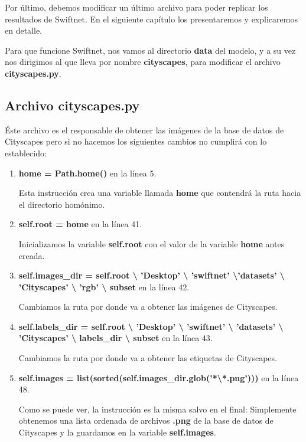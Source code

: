 Por último, debemos modificar un último archivo para poder replicar los resultados de Swiftnet. En el siguiente capítulo los presentaremos y explicaremos en detalle.

Para que funcione Swiftnet, nos vamos al directorio \textbf{data} del modelo, y a su vez nos dirigimos al que lleva por nombre \textbf{cityscapes}, para modificar el archivo \textbf{cityscapes.py}.

\subsection{Archivo cityscapes.py}

Éste archivo es el responsable de obtener las imágenes de la base de datos de Cityscapes pero si no hacemos los siguientes cambios no cumplirá con lo establecido:

\begin{enumerate}
\item \textbf{home = Path.home()} en la línea 5.

Esta instrucción crea una variable llamada \textbf{home} que contendrá la ruta hacia el directorio homónimo.

\item \textbf{self.root = home} en la línea 41.

Inicializamos la variable \textbf{self.root} con el valor de la variable \textbf{home} antes creada.

\item \textbf{self.images\_dir = self.root \textbackslash{} 'Desktop' \textbackslash{} 'swiftnet' \textbackslash{}'datasets' \textbackslash{} 'Cityscapes' \textbackslash{} 'rgb' \textbackslash{} subset} en la línea 42.

Cambiamos la ruta por donde va a obtener las imágenes de Cityscapes.

\item \textbf{self.labels\_dir = self.root \textbackslash{} 'Desktop' \textbackslash{} 'swiftnet' \textbackslash{} 'datasets' \textbackslash{} 'Cityscapes' \textbackslash{} labels\_dir \textbackslash{} subset} en la línea 43.

Cambiamos la ruta por donde va a obtener las etiquetas de Cityscapes.

\item \textbf{self.images = list(sorted(self.images\_dir.glob('*\textbackslash{*.png}')))} en la línea 48.

Como se puede ver, la instrucción es la misma salvo en el final: Simplemente obtenemos una lista ordenada de archivos \textbf{.png} de la base de datos de Cityscapes y la guardamos en la variable \textbf{self.images}.
\end{enumerate}

